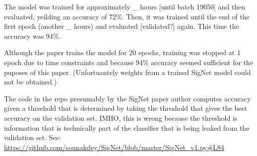 The model was trained for approximately \_ hours [until batch 19050] and then evaluated, yeilding an accuracy of 72\%.
Then, it was trained until the end of the first epoch (another \_ hours) and evaluated [validated?] again.
This time the accuracy was 94\%.

Although the paper trains the model for 20 epochs, training was stopped at 1 epoch due to time constraints and because 94\% accuracy seemed sufficient for the puposes of this paper.
(Unfortuantely weights from a trained SigNet model could not be obtained.)

The code in the repo presumably by the SigNet paper author computes accuracy given a thrsehold that is determined by taking the threshold that gives the best accuracy on the validation set.
IMHO, this is wrong because the threshold is information that is technically part of the classifier that is being leaked from the validation set.
See: \url{https://github.com/sounakdey/SigNet/blob/master/SigNet_v1.py#L84}
